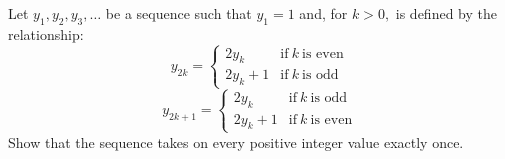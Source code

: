 Let $y_{1}, y_{2}, y_{3},\ldots$ be a sequence such that $y_{1}=1$ and, for $k>0,$ is defined by the relationship:\[y_{2k}=\begin{cases}2y_{k}& \text{if}~k~ \text{is even}\\ 2y_{k}+1 & \text{if}~k~ \text{is odd}\end{cases}\]\[y_{2k+1}=\begin{cases}2y_{k}& \text{if}~k~ \text{is odd}\\ 2y_{k}+1 & \text{if}~k~ \text{is even}\end{cases}\]Show that the sequence takes on every positive integer value exactly once.